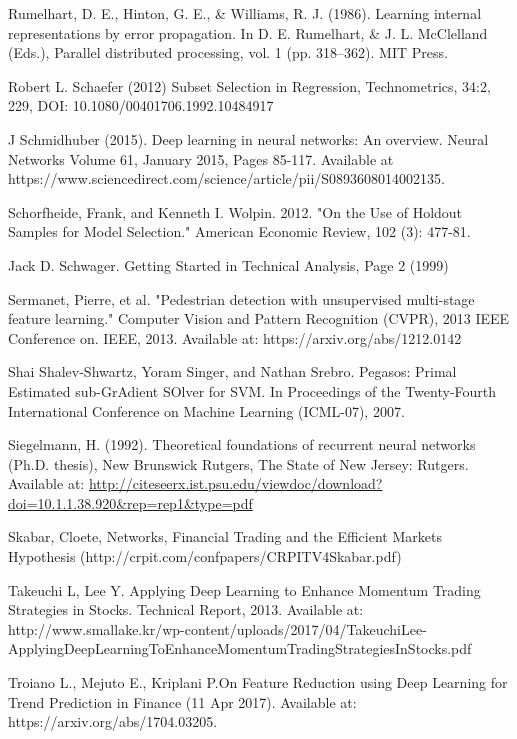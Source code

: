 \documentclass[a4paper,latin]{paper}
\begin{document}
\begin{thebibliography}{9}
Rumelhart, D. E., Hinton, G. E., \& Williams, R. J. (1986). Learning internal representations by error propagation. In D. E. Rumelhart, \& J. L. McClelland (Eds.), Parallel distributed processing, vol. 1 (pp. 318–362). MIT Press.

Robert L. Schaefer (2012) Subset Selection in Regression, Technometrics, 34:2, 229, DOI: 10.1080/00401706.1992.10484917
  
J Schmidhuber (2015). Deep learning in neural networks: An overview. Neural Networks Volume 61, January 2015, Pages 
85-117. Available at https://www.sciencedirect.com/science/article/pii/S0893608014002135. 
  
Schorfheide, Frank, and Kenneth I. Wolpin. 2012. "On the Use of Holdout Samples for Model Selection." American Economic Review, 102 (3): 477-81.

Jack D. Schwager. Getting Started in Technical Analysis, Page 2 (1999)


Sermanet, Pierre, et al. "Pedestrian detection with unsupervised multi-stage feature learning." Computer Vision and Pattern Recognition (CVPR), 2013 IEEE Conference on. IEEE, 2013.
Available at: https://arxiv.org/abs/1212.0142

Shai Shalev-Shwartz, Yoram Singer, and Nathan Srebro. Pegasos: Primal Estimated sub-GrAdient SOlver for SVM. In Proceedings of the Twenty-Fourth International Conference on Machine Learning (ICML-07), 2007.

Siegelmann, H. (1992). Theoretical foundations of recurrent neural networks (Ph.D. thesis), New Brunswick Rutgers, The State of New Jersey: Rutgers. Available at: \url{http://citeseerx.ist.psu.edu/viewdoc/download?doi=10.1.1.38.920&rep=rep1&type=pdf}

 Skabar, Cloete, Networks, Financial Trading and the Efficient Markets Hypothesis (http://crpit.com/confpapers/CRPITV4Skabar.pdf)

Takeuchi L, Lee Y. Applying Deep Learning to Enhance Momentum Trading Strategies in 
Stocks. Technical Report, 2013. Available at: http://www.smallake.kr/wp-content/uploads/2017/04/TakeuchiLee-ApplyingDeepLearningToEnhanceMomentumTradingStrategiesInStocks.pdf

Troiano L., Mejuto E., Kriplani P.On Feature Reduction using Deep Learning
for Trend Prediction in Finance (11 Apr 2017).  Available at: 
https://arxiv.org/abs/1704.03205.


\end{thebibliography}
\end{document}
